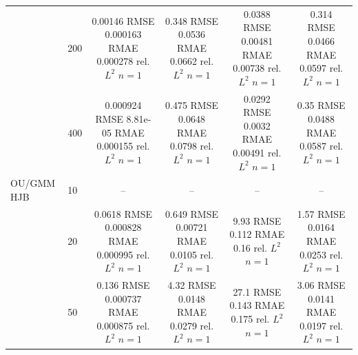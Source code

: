 \begin{tabular}{llcccc}
 & 200 & \shortstack{0.00146 RMSE\\0.000163 RMAE\\0.000278 rel. $L^2$\\$n=1$} & \shortstack{0.348 RMSE\\0.0536 RMAE\\0.0662 rel. $L^2$\\$n=1$} & \shortstack{0.0388 RMSE\\0.00481 RMAE\\0.00738 rel. $L^2$\\$n=1$} & \shortstack{0.314 RMSE\\0.0466 RMAE\\0.0597 rel. $L^2$\\$n=1$} \\
 & 400 & \shortstack{0.000924 RMSE\\8.81e-05 RMAE\\0.000155 rel. $L^2$\\$n=1$} & \shortstack{0.475 RMSE\\0.0648 RMAE\\0.0798 rel. $L^2$\\$n=1$} & \shortstack{0.0292 RMSE\\0.0032 RMAE\\0.00491 rel. $L^2$\\$n=1$} & \shortstack{0.35 RMSE\\0.0488 RMAE\\0.0587 rel. $L^2$\\$n=1$} \\
\addlinespace
OU/GMM HJB & 10 & -- & -- & -- & -- \\
 & 20 & \shortstack{0.0618 RMSE\\0.000828 RMAE\\0.000995 rel. $L^2$\\$n=1$} & \shortstack{0.649 RMSE\\0.00721 RMAE\\0.0105 rel. $L^2$\\$n=1$} & \shortstack{9.93 RMSE\\0.112 RMAE\\0.16 rel. $L^2$\\$n=1$} & \shortstack{1.57 RMSE\\0.0164 RMAE\\0.0253 rel. $L^2$\\$n=1$} \\
 & 50 & \shortstack{0.136 RMSE\\0.000737 RMAE\\0.000875 rel. $L^2$\\$n=1$} & \shortstack{4.32 RMSE\\0.0148 RMAE\\0.0279 rel. $L^2$\\$n=1$} & \shortstack{27.1 RMSE\\0.143 RMAE\\0.175 rel. $L^2$\\$n=1$} & \shortstack{3.06 RMSE\\0.0141 RMAE\\0.0197 rel. $L^2$\\$n=1$} \\

\end{tabular}

